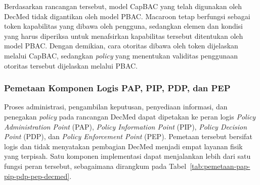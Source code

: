 Berdasarkan rancangan tersebut, model CapBAC yang telah digunakan oleh DecMed tidak digantikan oleh model PBAC. Macaroon tetap berfungsi sebagai token kapabilitas yang dibawa oleh pengguna, sedangkan elemen dan kondisi yang harus diperiksa untuk menafsirkan kapabilitas tersebut ditentukan oleh model PBAC. Dengan demikian, cara otoritas dibawa oleh token dijelaskan melalui CapBAC, sedangkan \textit{policy} yang menentukan validitas penggunaan otoritas tersebut dijelaskan melalui PBAC.

\subsubsection{Pemetaan Komponen Logis PAP, PIP, PDP, dan PEP}
\label{subsubsec:pemetaan-pap-pip-pdp-pep}

Proses administrasi, pengambilan keputusan, penyediaan informasi, dan penegakan \textit{policy} pada rancangan DecMed dapat dipetakan ke peran logis \textit{Policy Administration Point} (PAP), \textit{Policy Information Point} (PIP), \textit{Policy Decision Point} (PDP), dan \textit{Policy Enforcement Point} (PEP). Pemetaan tersebut bersifat logis dan tidak menyatakan pembagian DecMed menjadi empat layanan fisik yang terpisah. Satu komponen implementasi dapat menjalankan lebih dari satu fungsi peran tersebut, sebagaimana dirangkum pada Tabel~\ref{tab:pemetaan-pap-pip-pdp-pep-decmed}.

